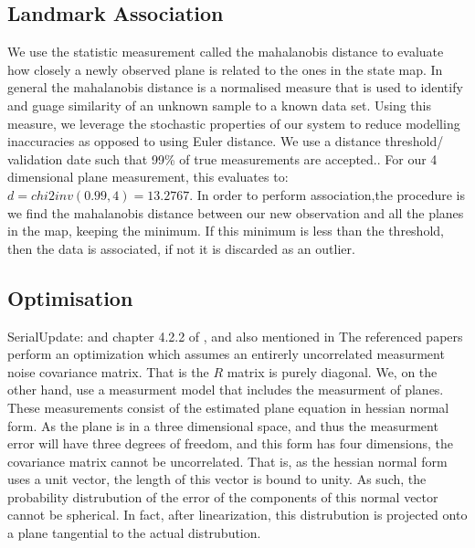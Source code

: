 \documentclass[]{article}
\begin{document}
{\subsection{Landmark Association} %
\label{sub:landmark_association}
We use the statistic measurement called the mahalanobis distance to evaluate how closely a newly observed plane is related to the ones in the state map. In general the mahalanobis distance is a normalised measure that is used to identify and guage similarity of an unknown sample to a known data set. Using this measure, we leverage the stochastic properties of our system to reduce modelling inaccuracies as opposed to using Euler distance. We use a distance threshold/ validation date such that 99\% of true measurements are accepted.. For our 4 dimensional plane measurement, this evaluates to:
$ d = chi2inv(0.99,4) = 13.2767$. In order to perform association,the procedure is we find the mahalanobis distance between our new observation and all the planes in the map, keeping the minimum. If this minimum is less than the threshold, then the data is associated, if not it is discarded as an outlier.

\subsection{Optimisation} %
\label{sub:optimisation}

SerialUpdate: \cite{OpenPilotPaper} and chapter 4.2.2 of \cite{KFBookSerialupdate}, and also mentioned in \cite{Sola2013}
The referenced papers perform an optimization which assumes an entirerly uncorrelated measurment noise covariance matrix. That is the $R$ matrix is purely diagonal.
We, on the other hand, use a measurment model that includes the measurment of planes. These measurements consist of the estimated plane equation in hessian normal form. As the plane is in a three dimensional space, and thus the measurment error will have three degrees of freedom, and this form has four dimensions, the covariance matrix cannot be uncorrelated.
That is, as the hessian normal form uses a unit vector, the length of this vector is bound to unity. As such, the probability distrubution of the error of the components of this normal vector cannot be spherical.
In fact, after linearization, this distrubution is projected onto a plane tangential to the actual distrubution. 

}
\end{document}

